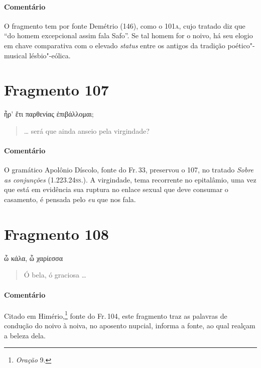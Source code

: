 \medskip

\paragraph{Comentário} O fragmento tem por fonte Demétrio (146), como o 101\textsc{a}, cujo tratado diz que
``do homem excepcional assim fala Safo''. Se tal homem for o
noivo, há seu elogio em chave comparativa com o elevado \emph{status}
entre os antigos da tradição poético"-musical lésbio"-eólica.


\section{Fragmento 107}

\begin{gkverse}
ἦρ’ ἔτι παρθενίας ἐπιβάλλομαι;
\end{gkverse}

\begin{verse}
\ldots{} será que ainda anseio pela virgindade?
\end{verse}

\medskip

\paragraph{Comentário} O gramático Apolônio Díscolo, fonte do Fr.\,33, preservou o 107, no tratado
\emph{Sobre as conjunções} (1.223.24\textsc{ss}.). A virgindade, tema recorrente no epitalâmio, uma
vez que está em evidência sua ruptura no enlace sexual que deve consumar o
casamento, é pensada pelo \emph{eu} que nos fala.

\section{Fragmento 108}

\begin{gkverse}
ὦ κάλα, ὦ χαρίεσσα
\end{gkverse}

\begin{verse}
Ó bela, ó graciosa \ldots{}
\end{verse}

\medskip

{\paragraph{Comentário} Citado em Himério,\footnote{\emph{Oração} 9.} fonte do Fr.\,104, este fragmento traz as palavras de condução do noivo à noiva, no aposento nupcial, informa a fonte, ao qual realçam a beleza dela.}


